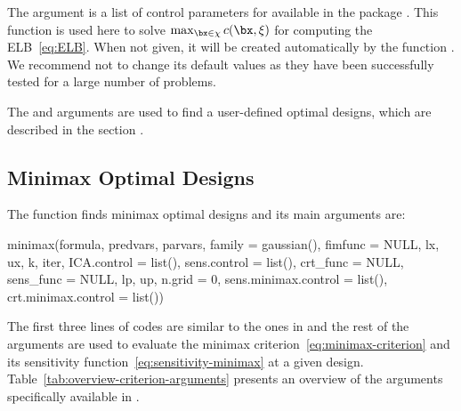 The argument  is a list of control parameters for    available in the  package  \citep{johnson2014nlopt}. This function is used here to solve  $\max_{\bx \in \chi}c(\bx, \xi)$ for  computing the ELB~\eqref{eq:ELB}. When not given, it will be created automatically   by the function .
We recommend not to change its  default values
as they have been successfully tested for a large number of problems.

The  and  arguments are used to find a user-defined optimal designs, which are described in
the section .


\subsection{Minimax Optimal Designs}
\label{sec:minimax}
The   function finds minimax optimal designs and  its main  arguments are:
  \begin{example}
minimax(formula, predvars, parvars, family = gaussian(), fimfunc = NULL,
        lx, ux, k, iter, ICA.control = list(), sens.control = list(),
        crt_func = NULL, sens_func = NULL,
        lp, up, n.grid = 0,
        sens.minimax.control = list(), crt.minimax.control = list())
\end{example}
The first three lines of codes are similar to the ones in  and the  rest of the arguments are used  to evaluate the minimax criterion~\eqref{eq:minimax-criterion} and its sensitivity function~\eqref{eq:sensitivity-minimax} at a given design. Table~\ref{tab:overview-criterion-arguments} presents an overview of the  arguments specifically available in .


